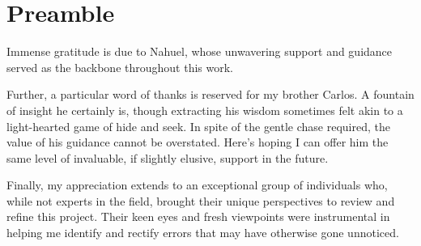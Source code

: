 
\chapter*{Preamble}\label{chap:preamble}
\thispagestyle{empty}


\thispagestyle{empty}
\vspace{1cm}

Immense gratitude is due to Nahuel, whose unwavering support and guidance
served as the backbone throughout this work.

Further, a particular word of thanks is reserved for my brother Carlos. A
fountain of insight he certainly is, though extracting his wisdom sometimes
felt akin to a light-hearted game of hide and seek. In spite of the gentle
chase required, the value of his guidance cannot be overstated. Here's hoping I
can offer him the same level of invaluable, if slightly elusive, support in the
future.

Finally, my appreciation extends to an exceptional group of individuals who,
while not experts in the field, brought their unique perspectives to review and
refine this project. Their keen eyes and fresh viewpoints were instrumental in
helping me identify and rectify errors that may have otherwise gone unnoticed.

